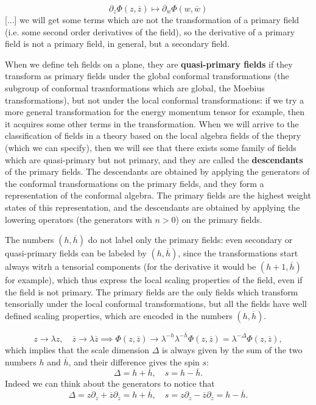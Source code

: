 \begin{example}
    \[
        \partial_z \Phi(z, \overline{z}) \mapsto \partial_w \Phi(w, \overline{w})
    \]
    [...]
    we will get some terms which are not the transformation of a primary field (i.e. some second order derivatives of the field), so the derivative of a primary field is not a primary field, in general, but a secondary field.
\end{example}

When we define teh fields on a plane, they are \textbf{quasi-primary fields} if they transform as primary fields under the global conformal transformations (the subgroup of conformal trasnformations which are global, the Moebius transformations), but not under the local conformal transformations: if we try a more general transformation for the energy momentum tensor for example, then it acquires some other terms in the transformation. When we will arrive to the classification of fields in a theory based on the local algebra fields of the thepry (which we can specify), then we will see that there exists some family of fields which are quasi-primary but not primary, and they are called the \textbf{descendants} of the primary fields. The descendants are obtained by applying the generators of the conformal transformations on the primary fields, and they form a representation of the conformal algebra. The primary fields are the highest weight states of this representation, and the descendants are obtained by applying the lowering operators (the generators with \(n > 0\)) on the primary fields.

The numbers \((h,\overline{h})\) do not label only the primary fields: even secondary or quasi-primary fields can be labeled by \((h,\overline{h})\), since the transformations start always witrh a tensorial components (for the derivative it would be \((h+1, \overline{h})\) for example), which thus express the local scaling properties of the field, even if the field is not primary. The primary fields are the only fields which transform tensorially under the local conformal transformations, but all the fields have well defined scaling properties, which are encoded in the numbers \((h,\overline{h})\).

\[
    z \to  \lambda z, \quad \overline{z} \to \lambda \overline{z} \implies \Phi(z, \overline{z}) \to \lambda^{-h} \lambda^{-\overline{h}} \Phi(z, \overline{z}) = \lambda^{-\Delta} \Phi(z, \overline{z}),
\]
which implies that the scale dimension \(\Delta\) is always given by the sum of the two numbers \(h\) and \(\overline{h}\), and their difference gives the spin \(s\):
\[
    \Delta = h + \overline{h}, \quad s = h - \overline{h}.
\]
Indeed we can think about the generators to notice that
\[
    \Delta = z \partial_z + \overline{z} \partial_{\overline{z}} = h + \overline{h}, \quad s = z \partial_z - \overline{z} \partial_{\overline{z}} = h - \overline{h}.
\]

